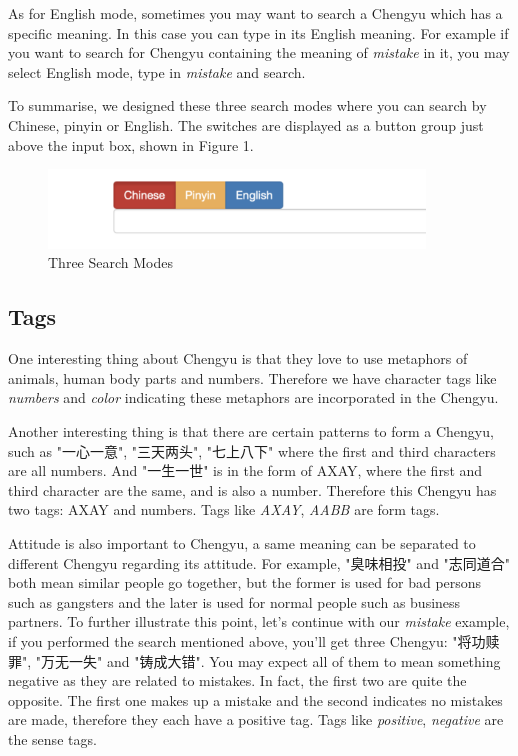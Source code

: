 \documentclass[11pt]{article} %
\begin{document}
As for English mode, sometimes you may want to search a Chengyu which has a specific meaning. In this case you can type in its English meaning. For example if you want to search for Chengyu containing the meaning of \textit{mistake} in it, you may select English mode, type in \textit{mistake} and search.

To summarise, we designed these three search modes where you can search by Chinese, pinyin or English. The switches are displayed as a button group just above the input box, shown in Figure 1.

\begin{figure}[htbp]
\begin{center}
\includegraphics[width=10cm]{searchmode.png}%
\caption{Three Search Modes}
\label{searchmode}
\end{center}
\end{figure}


\subsection{Tags}
\indent One interesting thing about Chengyu is that they love to use metaphors of animals, human body parts and numbers. Therefore we have character tags like \textit{numbers} and \textit{color} indicating these metaphors are incorporated in the Chengyu.

Another interesting thing is that there are certain patterns to form a Chengyu, such as "一心一意", "三天两头", "七上八下" where the first and third characters are all numbers. And "一生一世" is in the form of AXAY, where the first and third character are the same, and is also a number. Therefore this Chengyu has two tags: AXAY and numbers. Tags like \textit{AXAY}, \textit{AABB} are form tags.

Attitude is also important to Chengyu, a same meaning can be separated to different Chengyu regarding its attitude. For example, "臭味相投" and "志同道合" both mean similar people go together, but the former is used for bad persons such as gangsters and the later is used for normal people such as business partners. To further illustrate this point, let's continue with our \textit{mistake} example, if you performed the search mentioned above, you'll get three Chengyu: "将功赎罪", "万无一失" and "铸成大错". You may expect all of them to mean something negative as they are related to mistakes. In fact, the first two are quite the opposite. The first one makes up a mistake and the second indicates no mistakes are made, therefore they each have a positive tag. Tags like \textit{positive}, \textit{negative} are the sense tags.
\end{document}
